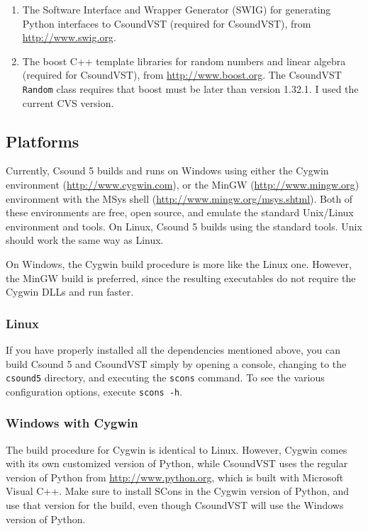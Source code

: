\documentclass[10pt,letterpaper,onecolumn]{book}
\begin{document}
\begin{enumerate}
\item The Software Interface and Wrapper Generator (SWIG) for generating Python interfaces to CsoundVST (required for CsoundVST), from \url{http://www.swig.org}.
\item The boost C++ template libraries for random numbers and linear algebra (required for CsoundVST), from \url{http://www.boost.org}. The CsoundVST \texttt{Random} class requires that boost must be later than version 1.32.1. I used the current CVS version.
\end{enumerate}

\subsection{Platforms}

Currently, Csound 5 builds and runs on Windows using either the Cygwin environment (\url{http://www.cygwin.com}), or the MinGW  (\url{http://www.mingw.org}) environment with the MSys shell (\url{http://www.mingw.org/msys.shtml}). Both of these environments are free, open source, and emulate the standard Unix/Linux environment and tools. On Linux, Csound 5 builds using the standard tools. Unix should work the same way as Linux.

On Windows, the Cygwin build procedure is more like the Linux one. However, the MinGW build is preferred, since the resulting executables do not require the Cygwin DLLs and run faster.

\subsubsection{Linux}

If you have properly installed all the dependencies mentioned above, you can build Csound 5 and CsoundVST simply by opening a console, changing to the \texttt{csound5} directory, and executing the \texttt{scons} command. To see the various configuration options, execute \texttt{scons -h}.

\subsubsection{Windows with Cygwin}

The build procedure for Cygwin is identical to Linux. However, Cygwin comes with its own customized version of Python, while CsoundVST uses the regular version of Python from \url{http://www.python.org}, which is built with Microsoft Visual C++. Make sure to install SCons in the Cygwin version of Python, and use that version for the build, even though CsoundVST will use the Windows version of Python.
\end{document}
